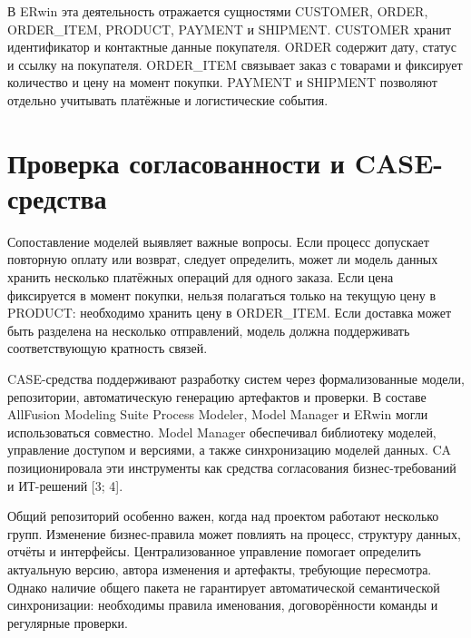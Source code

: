 \documentclass[essaypaper,paper]{pmk-graduate}
\begin{document}
\par

В ERwin эта деятельность отражается сущностями CUSTOMER, ORDER, ORDER\_ITEM, PRODUCT, PAYMENT и SHIPMENT. CUSTOMER хранит идентификатор и контактные данные покупателя. ORDER содержит дату, статус и ссылку на покупателя. ORDER\_ITEM связывает заказ с товарами и фиксирует количество и цену на момент покупки. PAYMENT и SHIPMENT позволяют отдельно учитывать платёжные и логистические события.

\par

\section{Проверка согласованности и CASE-средства}

Сопоставление моделей выявляет важные вопросы. Если процесс допускает повторную оплату или возврат, следует определить, может ли модель данных хранить несколько платёжных операций для одного заказа. Если цена фиксируется в момент покупки, нельзя полагаться только на текущую цену в PRODUCT: необходимо хранить цену в ORDER\_ITEM. Если доставка может быть разделена на несколько отправлений, модель должна поддерживать соответствующую кратность связей.

\par

CASE-средства поддерживают разработку систем через формализованные модели, репозитории, автоматическую генерацию артефактов и проверки. В составе AllFusion Modeling Suite Process Modeler, Model Manager и ERwin могли использоваться совместно. Model Manager обеспечивал библиотеку моделей, управление доступом и версиями, а также синхронизацию моделей данных. CA позиционировала эти инструменты как средства согласования бизнес-требований и ИТ-решений [3; 4].

\par

Общий репозиторий особенно важен, когда над проектом работают несколько групп. Изменение бизнес-правила может повлиять на процесс, структуру данных, отчёты и интерфейсы. Централизованное управление помогает определить актуальную версию, автора изменения и артефакты, требующие пересмотра. Однако наличие общего пакета не гарантирует автоматической семантической синхронизации: необходимы правила именования, договорённости команды и регулярные проверки.

\par
\end{document}
